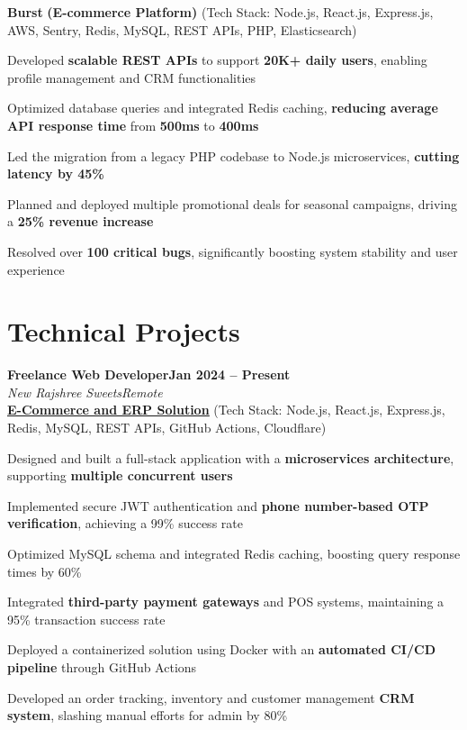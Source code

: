 \documentclass[letterpaper, 10pt]{article}
\newcommand{\heading}[2]{ \hspace{6pt}#1\hfill#2\\[0.8pt] }
\newcommand{\headingBf}[2]{ \heading{\textbf{#1}}{\textbf{#2}} }
\newcommand{\headingIt}[2]{ \heading{\textit{#1}}{\textit{#2}} }
\newenvironment{resume_list}{
\vspace{-5pt}
\begin{itemize}[itemsep=-3pt, parsep=0.2pt, leftmargin=20pt] }{ \end{itemize}
\vspace{-4pt}
}
\begin{document}
\vspace{2pt}

\hspace{10pt}\textbf{Burst} \textbf{(E-commerce Platform)} \small{(Tech Stack: Node.js, React.js, Express.js, AWS, Sentry, Redis, MySQL, REST APIs, PHP, Elasticsearch)}
\vspace{1pt}
\begin{resume_list}
	\item Developed \textbf{scalable REST APIs} to support \textbf{20K+ daily users}, enabling profile
	management and CRM functionalities \item Optimized database queries and integrated
	Redis caching, \textbf{reducing average API response time} from \textbf{500ms} to \textbf{400ms} \item
	Led the migration from a legacy PHP codebase to Node.js microservices, \textbf{cutting
	latency by 45\%} \item Planned and deployed multiple promotional deals for seasonal
	campaigns, driving a \textbf{25\% revenue increase} \item Resolved over \textbf{100 critical
	bugs}, significantly boosting system stability and user experience
\end{resume_list}

\section{Technical Projects}
\headingBf{Freelance Web Developer}{Jan 2024 -- Present}
\vspace{1pt}
\headingIt{New Rajshree Sweets}{Remote}
\vspace{2pt}
\hspace{10pt}\textbf{\href{https://newrajshreesweets.com}{\underline{E-Commerce and ERP Solution}}}
\small{(Tech Stack: Node.js, React.js, Express.js, Redis, MySQL, REST APIs, GitHub Actions, Cloudflare)}
\vspace{1pt}
\begin{resume_list}
	\item Designed and built a full-stack application with a \textbf{microservices architecture},
	supporting \textbf{multiple concurrent users} \item Implemented secure JWT authentication
	and \textbf{phone number-based OTP verification}, achieving a 99\% success rate \item
	Optimized MySQL schema and integrated Redis caching, boosting query response
	times by 60\% \item Integrated \textbf{third-party payment gateways} and POS systems,
	maintaining a 95\% transaction success rate \item Deployed a containerized solution
	using Docker with an \textbf{automated CI/CD pipeline} through GitHub Actions \item Developed
	an order tracking, inventory and customer management \textbf{CRM system}, slashing manual
	efforts for admin by 80\%
\end{resume_list}
\end{document}

